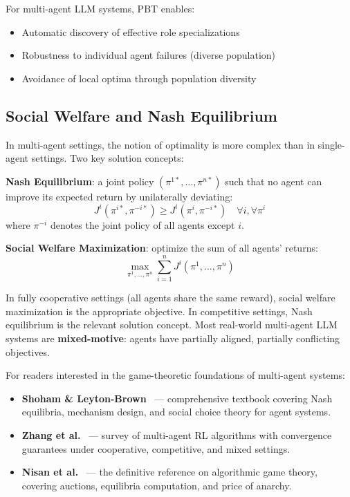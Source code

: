For multi-agent LLM systems, PBT enables:

\begin{itemize}
  \item Automatic discovery of effective role specializations
  \item Robustness to individual agent failures (diverse population)
  \item Avoidance of local optima through population diversity
\end{itemize}

\subsection{Social Welfare and Nash Equilibrium}
\label{social-welfare-and-nash-equilibrium}

In multi-agent settings, the notion of optimality is more complex than in single-agent settings. Two key solution concepts:

\textbf{Nash Equilibrium}: a joint policy $(\pi^{1*}, \ldots, \pi^{n*})$ such that no agent can improve its expected return by unilaterally deviating: 
\begin{equation}
  J^i(\pi^{i*}, \pi^{-i*}) \geq J^i(\pi^i, \pi^{-i*}) \quad \forall i, \forall \pi^i
\end{equation}
 where $\pi^{-i}$ denotes the joint policy of all agents except $i$.

\textbf{Social Welfare Maximization}: optimize the sum of all agents’ returns: 
\begin{equation}
  \max_{\pi^1,\ldots,\pi^n} \sum_{i=1}^{n} J^i(\pi^1, \ldots, \pi^n)
\end{equation}

In fully cooperative settings (all agents share the same reward), social welfare maximization is the appropriate objective. In competitive settings, Nash equilibrium is the relevant solution concept. Most real-world multi-agent LLM systems are \textbf{mixed-motive}: agents have partially aligned, partially conflicting objectives.

\begin{keybox}
For readers interested in the game-theoretic foundations of multi-agent systems:

\begin{itemize}
  \item \textbf{Shoham \& Leyton-Brown}~\cite{shoham2008multiagent} --- comprehensive textbook covering Nash equilibria, mechanism design, and social choice theory for agent systems.
  \item \textbf{Zhang et al.}~\cite{zhang2021multiagent} --- survey of multi-agent RL algorithms with convergence guarantees under cooperative, competitive, and mixed settings.
  \item \textbf{Nisan et al.}~\cite{nisan2007algorithmic} --- the definitive reference on algorithmic game theory, covering auctions, equilibria computation, and price of anarchy.
\end{itemize}
\end{keybox}

